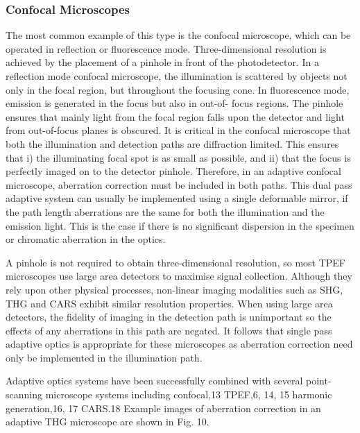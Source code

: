 \subsubsection{Confocal Microscopes}
\label{sec:ConfocalMicroscopes}

The most common example of this type is the confocal microscope, which can be 
operated in reflection or fluorescence mode. Three-dimensional resolution is 
achieved by the placement of a pinhole in front of the photodetector. In a 
reflection mode confocal microscope, the illumination is scattered by objects 
not only in the focal region, but throughout the focusing cone. In 
fluorescence mode, emission is generated in the focus but also in out-of-
focus regions. The pinhole ensures that mainly light from the focal region 
falls upon the detector and light from out-of-focus planes is obscured. It is 
critical in the confocal microscope that both the illumination and detection 
paths are diffraction limited. This ensures that i) the illuminating focal 
spot is as small as possible, and ii) that the focus is perfectly imaged on 
to the detector pinhole. Therefore, in an adaptive confocal microscope, 
aberration correction must be included in both paths. This dual pass adaptive 
system can usually be implemented using a single deformable mirror, if the 
path length aberrations are the same for both the illumination and the 
emission light. This is the case if there is no significant dispersion in the 
specimen or chromatic aberration in the optics.

A pinhole is not required to obtain three-dimensional resolution, so most 
TPEF microscopes use large area detectors to maximise signal collection. 
Although they rely upon other physical processes, non-linear imaging 
modalities such as SHG, THG and CARS exhibit similar resolution properties. 
When using large area detectors, the fidelity of imaging in the detection 
path is unimportant so the effects of any aberrations in this path are 
negated. It follows that single pass adaptive optics is appropriate for these 
microscopes as aberration correction need only be implemented in the 
illumination path.

Adaptive optics systems have been successfully combined with several point-
scanning microscope systems including confocal,13 TPEF,6, 14, 15 harmonic 
generation,16, 17 CARS.18 Example images of aberration correction in an 
adaptive THG microscope are shown in Fig. 10.

